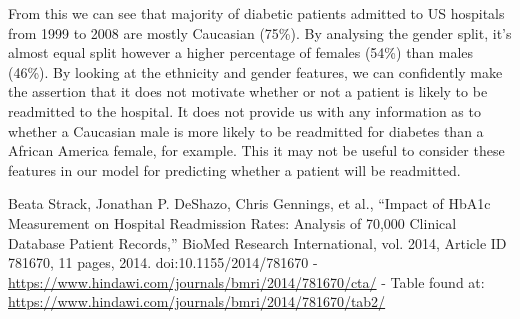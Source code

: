 \documentclass[11pt]{report}
\newcommand{\linespace}{\vspace{0.3cm}\noindent}
\begin{document}
\linespace
From this we can see that majority of diabetic patients admitted to US hospitals from 1999 to 2008 are mostly Caucasian (75\%). By analysing the gender split, it's almost equal split however a higher percentage of females (54\%) than males (46\%). By looking at the ethnicity and gender features, we can confidently make the assertion that it does not motivate whether or not a patient is likely to be readmitted to the hospital. It does not provide us with any information as to whether a Caucasian male is more likely to be readmitted for diabetes than a African America female, for example. This it may not be useful to consider these features in our model for predicting whether a patient will be readmitted. 


  \begin{thebibliography}{1}

   Beata Strack, Jonathan P. DeShazo, Chris Gennings, et al., “Impact of HbA1c Measurement on Hospital Readmission Rates: Analysis of 70,000 Clinical Database Patient Records,” BioMed Research International, vol. 2014, Article ID 781670, 11 pages, 2014. doi:10.1155/2014/781670 - \url{https://www.hindawi.com/journals/bmri/2014/781670/cta/} - Table found at: \url{https://www.hindawi.com/journals/bmri/2014/781670/tab2/}

  \end{thebibliography}
\end{document}
